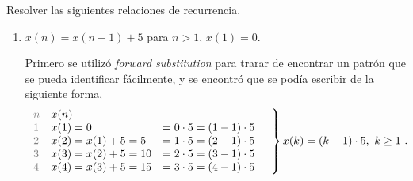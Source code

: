 Resolver las siguientes relaciones de recurrencia.
\begin{enumerate}[label=\textbf{\alph*.}]
    \item $x(n) = x(n-1) + 5$ para $n > 1$, $x(1) = 0$.
    \begin{solution}
        Primero se utilizó \textit{forward substitution} para trarar de encontrar un patrón que se pueda identificar fácilmente, y se encontró que se podía escribir de la siguiente forma,
        \begin{equation*}
            \begin{rcases}
                \begin{array}{l l l}
                    \txtgray{n} & x(n) & \\
                    \txtgray{1} & x(1) = 0 & = \dprod{0}{5} = \dprod{(1 - 1)}{5} \\
                    \txtgray{2} & x(2) = x(1) + 5 = 5 & = \dprod{1}{5} = \dprod{(2 - 1)}{5} \\
                    \txtgray{3} & x(3) = x(2) + 5 = 10 & = \dprod{2}{5} = \dprod{(3 - 1)}{5} \\
                    \txtgray{4} & x(4) = x(3) + 5 = 15 & = \dprod{3}{5} = \dprod{(4 - 1)}{5}
                \end{array} \quad
            \end{rcases}
            x(k) = \dprod{(k - 1)}{5},\ k \geq 1\ .
        \end{equation*}


\end{solution}
\end{enumerate}
